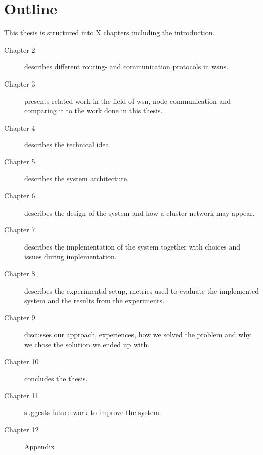 \documentclass[USenglish]{uit-thesis}
\begin{document}
\newpage

\section{Outline}
This thesis is structured into X chapters including the introduction.

\begin{description}
\item[Chapter 2] describes different routing- and communication protocols in \gls{wsn}s.
\item[Chapter 3] presents related work in the field of \gls{wsn}, node communication and comparing it to the work done in this thesis.
\item[Chapter 4] describes the technical idea.
\item[Chapter 5] describes the system architecture.
\item[Chapter 6] describes the design of the system and how a cluster network may appear.
\item[Chapter 7] describes the implementation of the system together with choices and issues during implementation.
\item[Chapter 8] describes the experimental setup, metrics used to evaluate the implemented system and the results from the experiments.
\item[Chapter 9] discusses our approach, experiences, how we solved the problem and why we chose the solution we ended up with.
\item[Chapter 10] concludes the thesis.
\item[Chapter 11] suggests future work to improve the system.
\item[Chapter 12] Appendix
\end{description}






\end{document}
